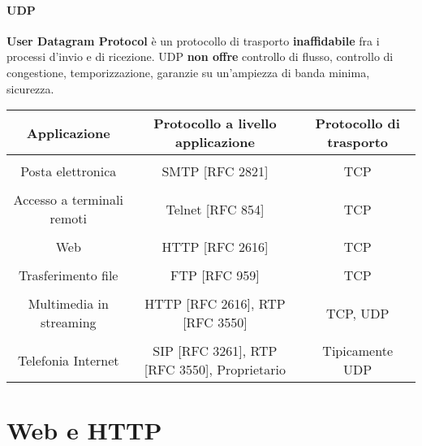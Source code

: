             \paragraph{UDP} \textbf{User Datagram Protocol} è un protocollo di trasporto \textbf{inaffidabile} fra i processi d'invio e di ricezione. UDP \textbf{non offre} controllo di flusso, controllo di congestione, temporizzazione, garanzie su un'ampiezza di banda minima, sicurezza.
            
            \begin{table}[H]
                \centering
                \begin{adjustbox}{max width=\textwidth}
                    \begin{tabular}{c c c}
                        \textbf{Applicazione} & \textbf{Protocollo a livello applicazione} & \textbf{Protocollo di trasporto} \\
                        \hline \\
                        Posta elettronica & SMTP [RFC 2821] & TCP \\
                        \hline \\
                        Accesso a terminali remoti & Telnet [RFC 854] & TCP \\
                        \hline \\
                        Web & HTTP [RFC 2616] & TCP \\
                        \hline \\
                        Trasferimento file & FTP [RFC 959] & TCP \\
                        \hline \\
                        Multimedia in streaming & HTTP [RFC 2616], RTP [RFC 3550] & TCP, UDP \\
                        \hline \\
                        Telefonia Internet & SIP [RFC 3261], RTP [RFC 3550], Proprietario & Tipicamente UDP \\  
                        \hline
                    \end{tabular}
                \end{adjustbox}
            \end{table}
            \newpage
\section{Web e HTTP}
